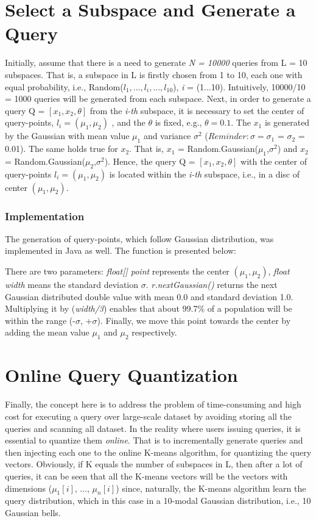 \documentclass{lmproj}
\begin{document}
\section{Select a Subspace and Generate a Query}
Initially, assume that there is a need to generate \textit{N = 10000} queries from L = 10 subspaces. That is, a subspace in L is firstly chosen from 1 to 10, each one with equal probability, i.e., Random($ l_1,...,l_{i},...,l_{10} $), \textit{i} = (1...10). Intuitively, 10000/10 = 1000 queries will be generated from each subspace. Next, in order to generate a query Q = $ [x_1,x_2,\theta] $ from the \textit{i-th} subspace, it is necessary to set the center of query-points, $ l_i=(\mu_1,\mu_2) $ , and the $ \theta $ is fixed, e.g., $ \theta=0.1 $. The  $ x_1 $ is generated by the Gaussian with mean value $ \mu_1 $ and variance $ \sigma^2 $ ($ Reminder: \sigma = \sigma_1 $ = $ \sigma_2 $ = 0.01). The same holds true for $ x_2 $. That is,  $ x_1 $ = Random.Gaussian($ \mu_1 $,$ \sigma^2 $) and  $ x_2 $ = Random.Gaussian($ \mu_2 $,$ \sigma^2 $). Hence, the query Q = $ [x_1,x_2,\theta] $ with the center of query-points $ l_i=(\mu_1,\mu_2) $ is located within the \textit{i-th} subspace, i.e., in a disc of center $ (\mu_1,\mu_2) $.

\subsubsection{Implementation}
The generation of query-points, which follow Gaussian distribution, was implemented in Java as well. The function is presented below:


There are two parameters: \textit{float[] point} represents the center $ (\mu_1,\mu_2) $, \textit{float width} means the standard deviation  $ \sigma $. \textit{r.nextGaussian()} returns the next Gaussian distributed double value with mean 0.0 and standard deviation 1.0. Multiplying it by (\textit{width/3}) enables that about 99.7\% of a population will be within the range (-$ \sigma $, +$ \sigma $). Finally, we move this point towards the center by adding the mean value $ \mu_1 $ and $ \mu_2 $ respectively. 



\section{Online Query Quantization}
Finally, the concept here is to address the problem of time-consuming and high cost for executing a query over large-scale dataset by avoiding storing all the queries and scanning all dataset. In the reality where users issuing queries, it is essential to quantize them \textit{online}. That is to incrementally generate queries and then injecting each one to the online K-means algorithm, for quantizing the query vectors. Obviously, if K equals the number of subspaces in L, then after a lot of queries, it can be seen that all the K-means vectors will be the vectors with dimensions ($ \mu_1[i] $, ..., $ \mu_n[i] $) since, naturally, the K-means algorithm learn the query distribution, which in this case in a 10-modal Gaussian distribution, i.e., 10 Gaussian bells.
\end{document}
